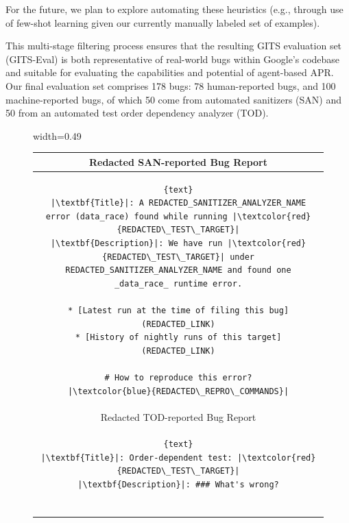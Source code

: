 For the future, we plan to explore automating these heuristics (e.g., through use of few-shot learning given our currently manually labeled set of examples).



This  multi-stage filtering process ensures that the resulting GITS evaluation set (GITS-Eval) is both representative of real-world bugs within Google's codebase and suitable for evaluating the capabilities and potential of agent-based APR. Our final evaluation set comprises 178 bugs: 78 human-reported bugs, and 100 machine-reported bugs, of
which 50 come from automated sanitizers (SAN) and 50 from an automated test order dependency analyzer (TOD). 





\begin{figure}[h]
\vspace{-0.0cm}
    \centering
\begin{adjustbox}{width=0.49\textwidth}
\begin{tabular}{c}
\toprule
\footnotesize{Redacted SAN-reported Bug Report}\\
\midrule
\begin{minipage}[t]{0.45\textwidth}\vspace{-1em}
\begin{lstlisting}[escapeinside=||, breaklines]{text}
|\textbf{Title}|: A REDACTED_SANITIZER_ANALYZER_NAME error (data_race) found while running |\textcolor{red}{REDACTED\_TEST\_TARGET}|
|\textbf{Description}|: We have run |\textcolor{red}{REDACTED\_TEST\_TARGET}| under REDACTED_SANITIZER_ANALYZER_NAME and found one _data_race_ runtime error.

* [Latest run at the time of filing this bug]
(REDACTED_LINK)
* [History of nightly runs of this target]
(REDACTED_LINK)

# How to reproduce this error?
|\textcolor{blue}{REDACTED\_REPRO\_COMMANDS}|
\end{lstlisting}
\end{minipage}\\
\midrule
\footnotesize{Redacted TOD-reported Bug Report}\\
\midrule
\begin{minipage}[t]{0.45\textwidth}\vspace{-1em}
\begin{lstlisting}[escapeinside=||, breaklines=true]{text}
|\textbf{Title}|: Order-dependent test: |\textcolor{red}{REDACTED\_TEST\_TARGET}|
|\textbf{Description}|: ### What's wrong?


\end{lstlisting}
\end{minipage}
\end{tabular}
\end{adjustbox}
\end{figure}
